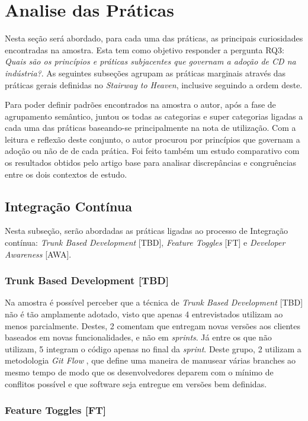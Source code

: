 \section{Analise das Práticas}

Nesta seção será abordado, para cada uma das práticas, as principais curiosidades encontradas na amostra. Esta tem como objetivo responder a pergunta RQ3: \emph{Quais são os princípios e práticas subjacentes que governam a adoção de CD na indústria?}. As seguintes subseções agrupam as práticas marginais através das práticas gerais definidas no \emph{Stairway to Heaven}, inclusive seguindo a ordem deste.

Para poder definir padrões encontrados na amostra o autor, após a fase de agrupamento semântico, juntou os todas as categorias e super categorias ligadas a cada uma das práticas baseando-se principalmente na nota de utilização. Com a leitura e reflexão deste conjunto, o autor procurou por princípios que governam a adoção ou não de de cada prática. Foi feito também um estudo comparativo com os resultados obtidos pelo artigo base \cite{empiricalStudy2016} para analisar discrepâncias e congruências entre os dois contextos de estudo.

\subsection{Integração Contínua}

Nesta subseção, serão abordadas as práticas ligadas ao processo de Integração contínua: \emph{Trunk Based Development} [TBD], \emph{Feature Toggles} [FT] e \emph{Developer Awareness} [AWA].
\subsubsection{Trunk Based Development [TBD]}
Na amostra é possível perceber que a técnica de \emph{Trunk Based Development} [TBD] não é tão amplamente adotado, visto que apenas 4 entrevistados utilizam ao menos parcialmente. Destes, 2 comentam que entregam novas versões aos clientes baseados em novas funcionalidades, e não em \emph{sprints}. Já entre os que não utilizam, 5 integram o código apenas no final da \emph{sprint}. Deste grupo, 2 utilizam a metodologia \emph{Git Flow} \cite{gitFlow}, que define uma maneira de manusear várias branches ao mesmo tempo de modo que os desenvolvedores deparem com o mínimo de conflitos possível e que software seja entregue em versões bem definidas.

\subsubsection{Feature Toggles [FT]}

